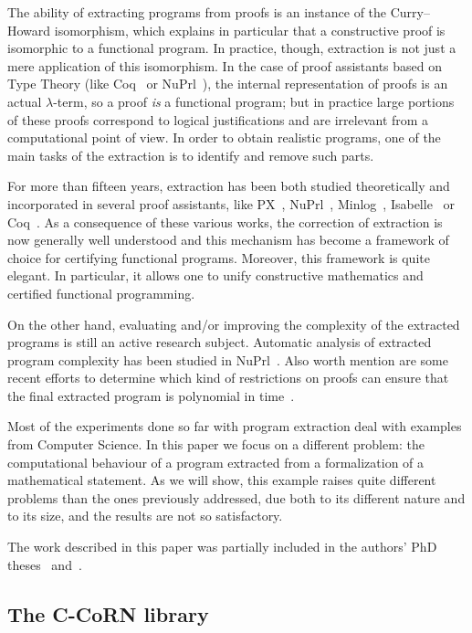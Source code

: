 \documentclass{entcs}
\begin{document}
The ability of extracting programs from proofs is an instance of the
Curry--Howard isomorphism, which explains in particular that a
constructive proof is isomorphic to a functional program. In practice,
though, extraction is not just a mere application of this
isomorphism. In the case of proof assistants based on Type Theory
(like Coq~\cite{coqmanual} or NuPrl~\cite{nuprl}), the internal
representation of proofs is an actual $\lambda$-term, so a proof {\it
is} a functional program; but in practice large portions of these
proofs correspond to logical justifications and are irrelevant from a
computational point of view. In order to obtain realistic programs,
one of the main tasks of the extraction is to identify and remove such
parts.

For more than fifteen years, extraction has been both studied
theoretically and incorporated in several proof assistants, like 
PX~\cite{PX}, NuPrl~\cite{nuprl}, Minlog~\cite{minlog}, 
Isabelle~\cite{ber:03} or Coq~\cite{moh:89b,pau:wer:93,let:03,let:04}. 
As a consequence of these various works, the correction of extraction is
now generally well understood and this mechanism has become a
framework of choice for certifying functional programs.
Moreover, this framework is quite elegant. In particular, it allows one to
unify constructive mathematics and certified functional programming.

On the other hand, evaluating and/or
improving the complexity of the extracted programs is still an active
research subject. Automatic analysis of extracted
program complexity has been studied in NuPrl~\cite{ben:00}.  
Also worth mention are some recent efforts to determine which kind of
restrictions on proofs can ensure that the final extracted program is
polynomial in time~\cite{aeh:ber:hof:sch:04}.

Most of the experiments done so far with program extraction deal with
examples from Computer Science.  In this paper we focus on a different
problem: the computational behaviour of a program extracted from a
formalization of a mathematical statement.  As we will show, this example
raises quite different problems than the ones previously addressed, due
both to its different nature and to its size, and
the results are not so satisfactory.

The work described in this paper was partially included in the
authors' PhD theses~\cite{lcf:04} and~\cite{let:04}.

\subsection{The C-CoRN library}
\end{document}
